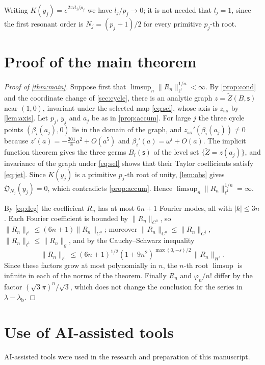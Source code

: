\documentclass[11pt]{amsart}
\numberwithin{equation}{section}
\theoremstyle{definition}
\theoremstyle{remark}
\newcommand{\abs}[1]{\lvert #1\rvert}
\newcommand{\norm}[1]{\lVert #1\rVert}
\newcommand{\Obs}{\mathfrak{O}}
\newcommand{\lb}{\lambda_{\mathrm b}}
\newcommand{\ssf}{\mathsf s}
\begin{document}
Writing $K(y_j)=e^{2\pi il_j/p_j}$ we have $l_j/p_j\to0$; it is not needed that $l_j=1$, since the first resonant order is $N_j=(p_j+1)/2$ for every primitive $p_j$-th root.

\section{Proof of the main theorem}\label{sec:end}

\begin{proof}[Proof of \cref{thm:main}]
Suppose first that $\limsup_n\norm{R_n}_{\ell^1}^{1/n}<\infty$. By \cref{prop:cond} and the coordinate change of \cref{sec:cycle}, there is an analytic graph $z=\widetilde Z(B,\ssf)$ near $(1,0)$, invariant under the selected map \eqref{eq:sel}, whose axis is $z_{\mathrm{ax}}$ by \cref{lem:axis}. Let $p_j$, $y_j$ and $a_j$ be as in \cref{prop:accum}. For large $j$ the three cycle points $(\beta_i(a_j),0)$ lie in the domain of the graph, and $z_{\mathrm{ax}}'(\beta_i(a_j))\ne0$ because $z'(a)=-\frac{201}8a^2+O(a^5)$ and $\beta_i'(a)=\omega^i+O(a)$. The implicit function theorem gives the three germs $B_i(\ssf)$ of the level set $\{\widetilde Z=z(a_j)\}$, and invariance of the graph under \eqref{eq:sel} shows that their Taylor coefficients satisfy \eqref{eq:jet}. Since $K(y_j)$ is a primitive $p_j$-th root of unity, \cref{lem:obs} gives $\Obs_{N_j}(y_j)=0$, which contradicts \cref{prop:accum}. Hence $\limsup_n\norm{R_n}_{\ell^1}^{1/n}=\infty$.

By \eqref{eq:deg} the coefficient $R_n$ has at most $6n+1$ Fourier modes, all with $\abs k\le3n$. Each Fourier coefficient is bounded by $\norm{R_n}_{C^0}$, so $\norm{R_n}_{\ell^1}\le(6n+1)\norm{R_n}_{C^0}$; moreover $\norm{R_n}_{C^0}\le\norm{R_n}_{C^j}$, $\norm{R_n}_{\ell^1}\le\norm{R_n}_\varrho$, and by the Cauchy--Schwarz inequality
\[
\norm{R_n}_{\ell^1}\le(6n+1)^{1/2}(1+9n^2)^{\max(0,-s)/2}\,\norm{R_n}_{H^s}.
\]
Since these factors grow at most polynomially in $n$, the $n$-th root $\limsup$ is infinite in each of the norms of the theorem. Finally $R_n$ and $\varphi_n/n!$ differ by the factor $(\sqrt3\pi)^n/\sqrt3$, which does not change the conclusion for the series in $\lambda-\lb$.
\end{proof}

\section*{Use of AI-assisted tools}
AI-assisted tools were used in the research and preparation of this manuscript.
\end{document}
